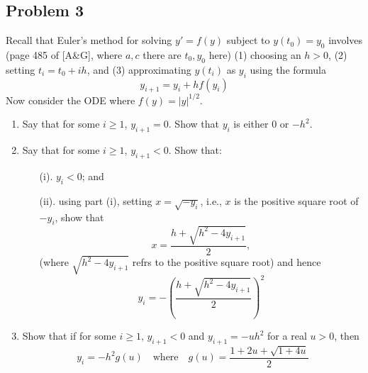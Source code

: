 \documentclass{article}
\begin{document}
\subsection*{Problem 3}
Recall that Euler's method for solving $y' = f(y)$ subject to $y(t_0) = y_0$
involves (page 485 of [A\&G], where $a,c$ there are $t_0,y_0$ here)
(1) choosing an $h > 0$,
(2) setting $t_i = t_0 + ih$, and
(3) approximating $y(t_i)$ as $y_i$ using the formula
\[
	y_{i+1} = y_i + hf(y_i)
\]
Now consider the ODE where $f(y) = |y|^{1/2}$.
\begin{enumerate}
	\item Say that for some $i \geq 1$, $y_{i+1} = 0$.
		Show that $y_i$ is either $0$ or $-h^2$.
	\item Say that for some $i \geq 1$, $y_{i+1} < 0$. Show that:
		\begin{enumerate}
			\item[(i).] $y_i < 0$; and
			\item[(ii).] using part (i), setting $x = \sqrt{-y_i}$, i.e.,
				$x$ is the positive square root of $-y_i$, show that
				\[
					x = \frac{h+\sqrt{h^2 - 4y_{i+1}}}{2},
				\]
				(where $\sqrt{h^2 - 4y_{i+1}}$ refrs to the positive square root)
				and hence
				\[
					y_i = -\left(\frac{h+\sqrt{h^2 - 4y_{i+1}}}{2}\right)^2
				\]
		\end{enumerate}
	\item Show that if for some $i \geq 1$, $y_{i+1} < 0$ and
		$y_{i+1} = -uh^2$ for a real $u > 0$, then
		\[
			y_i = -h^2g(u) \quad \text{where} \quad
			g(u) = \frac{1+2u+\sqrt{1+4u}}{2}
		\]
\end{enumerate}
\end{document}
